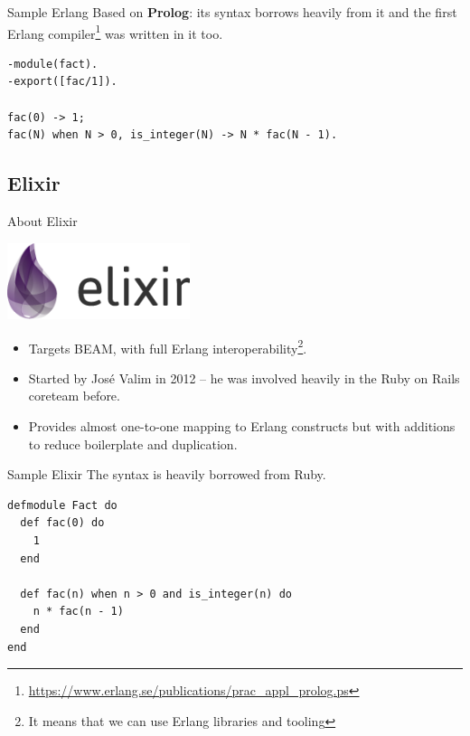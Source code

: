 \documentclass[12pt]{beamer}
\begin{document}
\begin{frame}[fragile]{Sample Erlang}
  Based on \textbf{Prolog}: its syntax borrows heavily from it and the first Erlang compiler\footnote{\url{https://www.erlang.se/publications/prac_appl_prolog.ps}} was written in it too.
  \begin{verbatim}
-module(fact).
-export([fac/1]).

fac(0) -> 1;
fac(N) when N > 0, is_integer(N) -> N * fac(N - 1).
  \end{verbatim}
\end{frame}

\subsection{Elixir}
\begin{frame}{About Elixir}
  \begin{center}
    \includegraphics[width=0.4\textwidth]{elixir}
  \end{center}
  \begin{itemize}
    \item Targets BEAM, with full Erlang interoperability\footnote{It means that we can use Erlang libraries and tooling}.
    \item Started by Jos\'{e} Valim in 2012 -- he was involved heavily in the Ruby on Rails coreteam before.
    \item Provides almost one-to-one mapping to Erlang constructs but with additions to reduce boilerplate and duplication.
  \end{itemize}
\end{frame}

\begin{frame}[fragile]{Sample Elixir}
  The syntax is heavily borrowed from Ruby.
  \begin{verbatim}
defmodule Fact do
  def fac(0) do
    1
  end

  def fac(n) when n > 0 and is_integer(n) do
    n * fac(n - 1)
  end
end
  \end{verbatim}
\end{frame}
\end{document}
